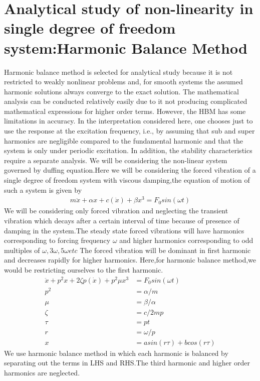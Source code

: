 \chapter{Analytical study of non-linearity in single degree of freedom system:Harmonic Balance Method}
Harmonic balance method is selected for analytical study because it is not restricted to weakly nonlinear problems and, for smooth systems the assumed harmonic solutions always converge to the exact solution. The mathematical analysis can be conducted relatively easily due to it not producing complicated mathematical expressions for higher order terms. However, the HBM has some limitations in accuracy. In the interpretation considered here, one chooses just to use the response at the excitation frequency, i.e., by assuming that sub and super harmonics are negligible compared to the fundamental harmonic and that the system is only under periodic excitation. In addition, the stability characteristics require a separate analysis. 
We will be considering the non-linear system governed by duffing equation.Here we will be considering the forced vibration of a single degree of freedom system with viscous damping,the equation of motion of such a system is given by
\begin{align}
m\ddot{x}+\alpha x+c(\dot{x})+\beta x^3=F_0sin(\omega t)
\end{align}
We will be considering only forced vibration and neglecting the transient vibration which decays after a certain interval of time because of presence of damping in the system.The steady state forced vibrations will have harmonics corresponding to forcing frequency $\omega$ and higher harmonics corresponding to odd multiples of $\omega ,3\omega , 5\omega etc$ The forced vibration will be dominant in first harmonic and decreases rapidly for higher harmonics.
Here,for harmonic balance method,we would be restricting ourselves to the first harmonic.
\begin{align}
\ddot{x}+p^2 x+2 \zeta p (\dot{x})+p^2 \mu x^3 &=F_0sin(\omega t)\\
p^2 &= \alpha /m \\
\mu & = \beta / \alpha \\
\zeta &=c/2mp \\
\tau &= pt \\
r &= \omega /p \\
x &= asin(r\tau )+bcos(r\tau)
\end{align}
We use harmonic balance method in which each harmonic is balanced by separating out the terms in LHS and RHS.The third harmonic and higher order harmonics are neglected.
